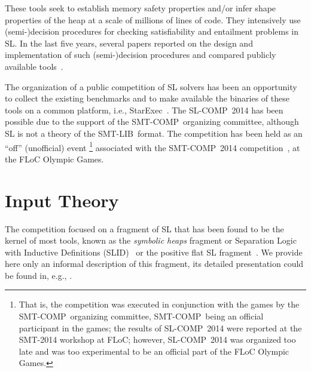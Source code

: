 \documentclass[twoside,11pt]{article}
\newcommand{\SLRD}{\textsc{SLID}}
\newcommand{\smtlib}{\textsf{SMT-LIB}}
\newcommand{\smtcomp}{\textsf{SMT-COMP}}
\newcommand{\slcomp}{\textsf{SL-COMP}}
\newcommand{\starexec}{\textsf{StarExec}}
\begin{document}
These tools seek to establish memory safety properties and/or infer shape properties of the heap at a scale of millions of lines of code.
They intensively use (semi-)decision procedures for checking satisfiability and entailment problems in SL.
In the last five years, several papers reported on the design and implementation of such (semi-)decision procedures and compared publicly available tools~\cite{HasseIOP13}.

The organization of a public competition of SL solvers has been an opportunity 
to collect the existing benchmarks and  
to make available the binaries of these tools on a common platform, i.e., \starexec~\cite{StarExecsite}.
The \slcomp\ 2014 has been possible due to the support of the \smtcomp\ organizing committee, 
although SL is not a theory of the \smtlib\ format.
The competition has been held as an ``off'' (unofficial) event \footnote{That is, the competition was executed in conjunction with the games by the \smtcomp\ organizing committee, \smtcomp\ being an official participant in the games; the results of \slcomp\ 2014 were reported at the SMT-2014 workshop at FLoC; however, \slcomp\ 2014 was organized too late and was too experimental to be an official part of the FLoC Olympic Games.}
associated with the \smtcomp\ 2014 competition~\cite{SMTCOMPsite}, at the FLoC Olympic Games.


\section{Input Theory}
\label{sec:SL}

The competition focused on a fragment of SL that has been found to be the kernel of most tools, known 
as
the \emph{symbolic heaps} fragment
or Separation Logic with Inductive Definitions (\SLRD)~\cite{IosifRS13} or
the positive flat SL fragment~\cite{AntonopoulosGHKO14}. 
We provide here only an informal description of this fragment, its detailed presentation could be found in, e.g., \cite{Reynolds02,IosifRS13,AntonopoulosGHKO14}.  
\end{document}
